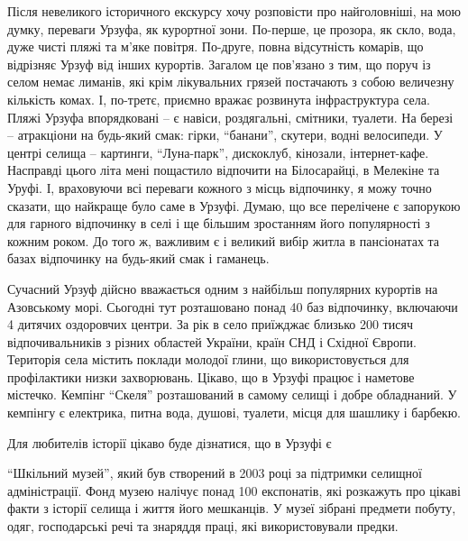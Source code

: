 Після невеликого історичного екскурсу хочу розповісти про найголовніші, на мою
думку, переваги Урзуфа, як курортної зони. По-перше, це прозора, як скло, вода,
дуже чисті пляжі та м'яке повітря. По-друге, повна відсутність комарів, що
відрізняє Урзуф від інших курортів. Загалом це пов'язано з тим, що поруч із
селом немає лиманів, які крім лікувальних грязей постачають з собою величезну
кількість комах. І, по-третє, приємно вражає розвинута інфраструктура села.
Пляжі Урзуфа впорядковані – є навіси, роздягальні, смітники, туалети. На березі
– атракціони на будь-який смак: гірки, \enquote{банани}, скутери, водні велосипеди. У
центрі селища – картинги, \enquote{Луна-парк}, дискоклуб, кінозали, інтернет-кафе.
Насправді цього літа мені пощастило відпочити на Білосарайці, в Мелекіне та
Уруфі. І, враховуючи всі переваги кожного з місць відпочинку, я можу точно
сказати, що найкраще було саме в Урзуфі. Думаю, що все перелічене є запорукою
для гарного відпочинку в селі і ще більшим зростанням його популярності з
кожним роком. До того ж, важливим є і великий вибір житла в пансіонатах та
базах відпочинку на будь-який смак і гаманець.


Сучасний Урзуф дійсно вважається одним з найбільш популярних курортів на
Азовському морі. Сьогодні тут розташовано понад 40 баз відпочинку, включаючи 4
дитячих оздоровчих центри. За рік в село приїжджає близько 200 тисяч
відпочивальників з різних областей України, країн СНД і Східної Європи.
Територія села містить поклади молодої глини, що використовується для
профілактики низки захворювань. Цікаво, що в Урзуфі працює і наметове містечко.
Кемпінг \enquote{Скеля} розташований в самому селищі і добре обладнаний. У кемпінгу є
електрика, питна вода, душові, туалети, місця для шашлику і барбекю.


Для любителів історії цікаво буде дізнатися, що в Урзуфі є\par\noindent\enquote{Шкільний музей},
який був створений в 2003 році за підтримки селищної адміністрації. Фонд музею
налічує понад 100 експонатів, які розкажуть про цікаві факти з історії селища і
життя його мешканців. У музеї зібрані предмети побуту, одяг, господарські речі
та знаряддя праці, які використовували предки.


